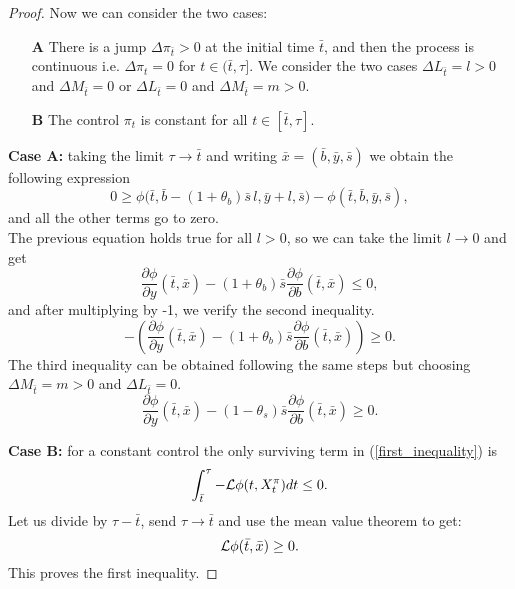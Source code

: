 \begin{proof}
Now we can consider the two cases:
\begin{enumerate}
 \item[\textbf{A}] There is a jump $\Delta \pi_{\bar t}>0$ at the initial time $\bar t$, and then the process is continuous i.e. $\Delta \pi_{t}=0$ for 
 $t \in (\bar t, \tau]$. We consider the two cases $\Delta L_{\bar t} = l >0$ and $\Delta M_{\bar t}=0$ or $\Delta L_{\bar t} =0$ and $\Delta M_{\bar t}=m>0$.
 \item[\textbf{B}] The control $\pi_t$ is constant for all $t \in [\bar t, \tau]$.   
\end{enumerate}
\textbf{Case A:}
taking the limit $\tau \to \bar t$ and writing $\bar x = (\bar b, \bar y, \bar s)$ we obtain the following expression
\begin{equation*}
 0 \geq \phi \bigl( \bar t, \bar b - (1+\theta_b) \bar s\, l, \bar y + l, \bar s \bigr) - \phi(\bar t, \bar b, \bar y, \bar s),
\end{equation*} 
and all the other terms go to zero. \\
The previous equation holds true for all $l>0$, so we can take the limit $l \to 0$ and get
\begin{equation*}
 \frac{\partial \phi}{\partial y}(\bar t, \bar x)
 -(1+\theta_b) \bar s \frac{\partial \phi}{\partial b}(\bar t, \bar x) \leq 0,
\end{equation*}
and after multiplying by -1, we verify the second inequality. 
\begin{equation*}
-\left(\frac{\partial \phi}{\partial y}(\bar t, \bar x)
 -(1+\theta_b) \bar s \frac{\partial \phi}{\partial b}(\bar t, \bar x)\right) \geq 0.
\end{equation*}
The third inequality can be obtained following the same steps but choosing $\Delta M_{\bar t} = m >0$ and $\Delta L_{\bar t}=0$.
$$\frac{\partial \phi}{\partial y}(\bar t, \bar x)-(1-\theta_s) \bar s \frac{\partial \phi}{\partial b}(\bar t, \bar x) \geq 0.$$

\noindent
\textbf{Case B:}
for a constant control the only surviving term in (\ref{first_inequality}) is 
\begin{equation*}
 \int_{\bar t}^{\tau} -\mathcal{L} \phi(t,X^{\pi}_t) dt \leq 0.
\end{equation*}
Let us divide by $\tau- \bar t$, send $\tau \to \bar t$ and use the mean value theorem to get:
\begin{equation*}
 \mathcal{L} \phi(\bar t, \bar x) \geq 0.
\end{equation*}
This proves the first inequality.
\end{proof}


